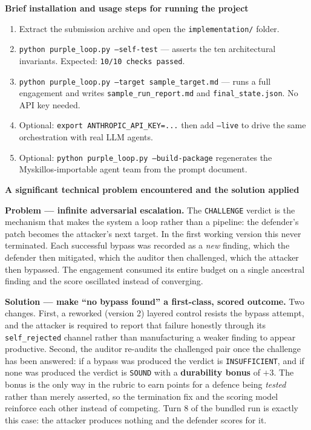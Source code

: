 \documentclass[11pt,a4paper]{article}
\newcommand{\qa}[2]{\textbf{#1}\par\vspace{-2pt}\begin{answerbox}#2\end{answerbox}}
\begin{document}
\qa{Brief installation and usage steps for running the project}{%
\begin{enumerate}[nosep]
  \item Extract the submission archive and open the \texttt{implementation/} folder.
  \item \texttt{python purple\_loop.py --self-test} --- asserts the ten architectural
        invariants. Expected: \texttt{10/10 checks passed}.
  \item \texttt{python purple\_loop.py --target sample\_target.md} --- runs a full
        engagement and writes \texttt{sample\_run\_report.md} and
        \texttt{final\_state.json}. No API key needed.
  \item Optional: \texttt{export ANTHROPIC\_API\_KEY=...} then add \texttt{--live} to drive
        the same orchestration with real LLM agents.
  \item Optional: \texttt{python purple\_loop.py --build-package} regenerates the
        Myskillos-importable agent team from the prompt document.
\end{enumerate}}

\qa{A significant technical problem encountered and the solution applied}{%
\textbf{Problem --- infinite adversarial escalation.} The \texttt{CHALLENGE} verdict is the
mechanism that makes the system a loop rather than a pipeline: the defender's patch becomes
the attacker's next target. In the first working version this never terminated. Each
successful bypass was recorded as a \emph{new} finding, which the defender then mitigated,
which the auditor then challenged, which the attacker then bypassed. The engagement
consumed its entire budget on a single ancestral finding and the score oscillated instead
of converging.

\textbf{Solution --- make ``no bypass found'' a first-class, scored outcome.} Two changes.
First, a reworked (version 2) layered control resists the bypass attempt, and the attacker
is required to report that failure honestly through its \texttt{self\_rejected} channel
rather than manufacturing a weaker finding to appear productive. Second, the auditor
re-audits the challenged pair once the challenge has been answered: if a bypass was
produced the verdict is \texttt{INSUFFICIENT}, and if none was produced the verdict is
\texttt{SOUND} with a \textbf{durability bonus} of $+3$. The bonus is the only way in the
rubric to earn points for a defence being \emph{tested} rather than merely asserted, so
the termination fix and the scoring model reinforce each other instead of competing. Turn
8 of the bundled run is exactly this case: the attacker produces nothing and the defender
scores for it.}
\end{document}
